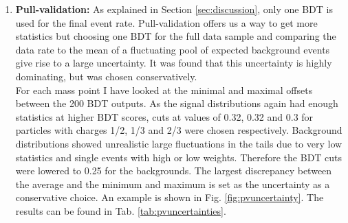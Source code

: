 \begin{enumerate}
\item \textbf{Pull-validation: }As explained in Section \ref{sec:discussion}, only one BDT is used for the final event rate. Pull-validation offers us a way to get more statistics but choosing one BDT for the full data sample and comparing the data rate to the mean of a fluctuating pool of expected background events give rise to a large uncertainty. It was found that this uncertainty is highly dominating, but was chosen conservatively.\\

\noindent For each mass point I have looked at the minimal and maximal offsets between the 200 BDT outputs. As the signal distributions again had enough statistics at higher BDT scores, cuts at values of 0.32, 0.32 and 0.3 for particles with charges 1/2, 1/3 and 2/3 were chosen respectively. Background distributions showed unrealistic large fluctuations in the tails due to very low statistics and single events with high or low weights. Therefore the BDT cuts were lowered to 0.25 for the backgrounds. The largest discrepancy between the average and the minimum and maximum is set as the uncertainty as a conservative choice. An example is shown in Fig. \ref{fig:pvuncertainty}. The results can be found in Tab. \ref{tab:pvuncertainties}.
\end{enumerate}

\begin{table}[]
\centering
\caption{Results from the detector and flux uncertainties}
\label{tab:detectoruncertainties}
\end{table}

